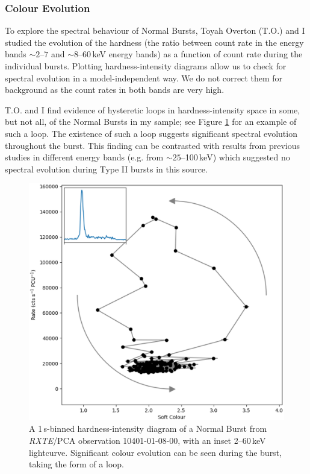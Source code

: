 \subsubsection{Colour Evolution}

\par To explore the spectral behaviour of Normal Bursts, Toyah Overton (\textsf{T.O.}) and I studied the evolution of the hardness (the ratio between count rate in the energy bands $\sim2$--$7$ and $\sim8$--$60$\,keV energy bands) as a function of count rate during the individual bursts.  Plotting hardness-intensity diagrams allow us to check for spectral evolution in a model-independent way.  We do not correct them for background as the count rates in both bands are very high.
\par \textsf{T.O.} and I find evidence of hysteretic loops in hardness-intensity space in some, but not all, of the Normal Bursts in my sample; see Figure \ref{fig:loop} for an example of such a loop.  The existence of such a loop suggests significant spectral evolution throughout the burst.  This finding can be contrasted with results from previous studies in different energy bands (e.g. \citealp{Woods_OB2} from $\sim25$--100\,keV) which suggested no spectral evolution during Type II bursts in this source.

\begin{figure}
  \centering
  \includegraphics[width=.9\linewidth, trim={0.4cm 1cm 1.1cm 1cm},clip]{images/Loop1.eps}
  \caption[A hardness-intensity diagram of a typical Normal Burst.]{\small A 1\,s-binned hardness-intensity diagram of a Normal Burst from \indexpca\textit{RXTE}/PCA observation 10401-01-08-00, with an inset 2--60\,keV lightcurve.  Significant colour evolution can be seen during the burst, taking the form of a loop.}
  \label{fig:loop}
\end{figure}

